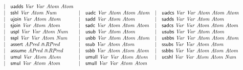 \begin{figure*}
\begin{math}
\begin{array}{rclclcl}
      & | & \clUAdds\ \mathit{Var}\ \mathit{Var}\
            \mathit{Atom}\ \mathit{Atom}\\
      & | & \clSShl\ \mathit{Var}\ \mathit{Atom}\ \mathit{Num}
      & | & \clUAdc\ \mathit{Var}\ \mathit{Atom}\
            \mathit{Atom}\ \mathit{Atom}
      & | & \clUAdcs\ \mathit{Var}\ \mathit{Var}\
            \mathit{Atom}\ \mathit{Atom}\ \mathit{Atom}\\
      & | & \clUJoin\ \mathit{Var}\ \mathit{Atom}\ \mathit{Atom}
      & | & \clSAdd\ \mathit{Var}\ \mathit{Atom}\ \mathit{Atom}
      & | & \clSAdds\ \mathit{Var}\ \mathit{Var}\
            \mathit{Atom}\ \mathit{Atom}\\
      & | & \clSJoin\ \mathit{Var}\ \mathit{Atom}\ \mathit{Atom}
      & | & \clSAdc\ \mathit{Var}\ \mathit{Atom}\
            \mathit{Atom}\ \mathit{Atom}
      & | & \clSAdcs\ \mathit{Var}\ \mathit{Var}\
            \mathit{Atom}\ \mathit{Atom}\ \mathit{Atom}\\
      & | & \clUSplit\ \mathit{Var}\ \mathit{Var}\
            \mathit{Atom}\ \mathit{Num}
      & | & \clUSub\ \mathit{Var}\ \mathit{Atom}\ \mathit{Atom}
      & | & \clUSubs\ \mathit{Var}\ \mathit{Var}\
            \mathit{Atom}\ \mathit{Atom}\\
      & | & \clSSplit\ \mathit{Var}\ \mathit{Var}\
            \mathit{Atom}\ \mathit{Num}
      & | & \clUSbb\ \mathit{Var}\ \mathit{Atom}\
            \mathit{Atom}\ \mathit{Atom}
      & | & \clUSbbs\ \mathit{Var}\ \mathit{Var}\
            \mathit{Atom}\ \mathit{Atom}\ \mathit{Atom}\\
      & | & \clAssert\ \mathit{APred} \clConj \mathit{RPred}
      & | & \clSSub\ \mathit{Var}\ \mathit{Atom}\ \mathit{Atom}
      & | & \clSSubs\ \mathit{Var}\ \mathit{Var}\
            \mathit{Atom}\ \mathit{Atom}\\
      & | & \clAssume\ \mathit{APred} \clConj \mathit{RPred}
      & | & \clSSbb\ \mathit{Var}\ \mathit{Atom}\
            \mathit{Atom}\ \mathit{Atom}
      & | & \clSSbbs\ \mathit{Var}\ \mathit{Var}\
            \mathit{Atom}\ \mathit{Atom}\ \mathit{Atom}\\
      & | & \clUMul\ \mathit{Var}\ \mathit{Atom}\ \mathit{Atom}
      & | & \clUMull\ \mathit{Var}\ \mathit{Var}\
            \mathit{Atom}\ \mathit{Atom}
      & | & \clUCShl\ \mathit{Var}\ \mathit{Var}\
            \mathit{Atom}\ \mathit{Atom}\ \mathit{Num}\\
      & | & \clSMul\ \mathit{Var}\ \mathit{Atom}\ \mathit{Atom}
      & | & \clSMull\ \mathit{Var}\ \mathit{Var}\
            \mathit{Atom}\ \mathit{Atom}

\end{array}
\end{math}
\end{figure*}
